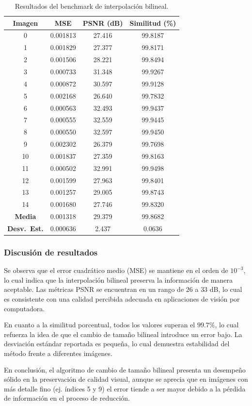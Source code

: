 \documentclass[12pt,a4paper]{article}
\begin{document}
\begin{table}[H]
\centering
\caption{Resultados del benchmark de interpolación bilineal.}
\label{tab:bilinear-benchmark}
\begin{tabular}{c|c|c|c}
\hline
Imagen & MSE & PSNR (dB) & Similitud (\%) \\ \hline
0  & 0.001813 & 27.416 & 99.8187 \\
1  & 0.001829 & 27.377 & 99.8171 \\
2  & 0.001506 & 28.221 & 99.8494 \\
3  & 0.000733 & 31.348 & 99.9267 \\
4  & 0.000872 & 30.597 & 99.9128 \\
5  & 0.002168 & 26.640 & 99.7832 \\
6  & 0.000563 & 32.493 & 99.9437 \\
7  & 0.000555 & 32.559 & 99.9445 \\
8  & 0.000550 & 32.597 & 99.9450 \\
9  & 0.002302 & 26.379 & 99.7698 \\
10 & 0.001837 & 27.359 & 99.8163 \\
11 & 0.000502 & 32.991 & 99.9498 \\
12 & 0.001599 & 27.963 & 99.8401 \\
13 & 0.001257 & 29.005 & 99.8743 \\
14 & 0.001680 & 27.746 & 99.8320 \\ \hline
\textbf{Media} & 0.001318 & 29.379 & 99.8682 \\
\textbf{Desv.~Est.} & 0.000636 & 2.437 & 0.0636 \\ \hline
\end{tabular}
\end{table}

\subsubsection{Discusión de resultados}
Se observa que el error cuadrático medio (MSE) se mantiene en el orden de $10^{-3}$, lo cual indica que la interpolación bilineal preserva la información de manera aceptable. Las métricas PSNR se encuentran en un rango de $26$ a $33$ dB, lo cual es consistente con una calidad percibida adecuada en aplicaciones de visión por computadora.  

En cuanto a la similitud porcentual, todos los valores superan el $99.7\%$, lo cual refuerza la idea de que el cambio de tamaño bilineal introduce un error bajo. La desviación estándar reportada es pequeña, lo cual demuestra estabilidad del método frente a diferentes imágenes.

En conclusión, el algoritmo de cambio de tamaño bilineal presenta un desempeño sólido en la preservación de calidad visual, aunque se aprecia que en imágenes con más detalle fino (ej. índices 5 y 9) el error tiende a ser mayor debido a la pérdida de información en el proceso de reducción.
\end{document}
